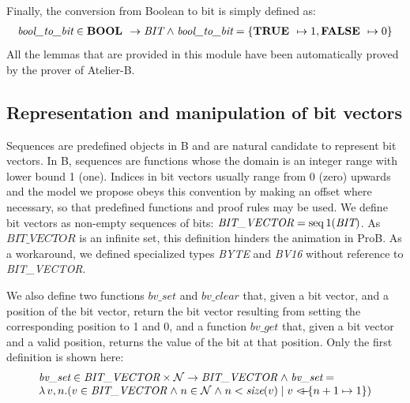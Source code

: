 \documentclass[a4paper]{llncs}
\begin{document}
Finally, the conversion from Boolean to bit is simply defined as:
$$
\begin{array}{l}
\textit{bool\_to\_bit} \in \textbf{BOOL } \rightarrow \textit{BIT} \mathrel{\wedge} \textit{bool\_to\_bit} = \{ \textbf{TRUE } \mapsto 1, \textbf{FALSE } \mapsto 0 \} \\
\end{array}
$$
All the lemmas that are provided in this module have been
automatically proved by the prover of Atelier-B.


\subsection{Representation and manipulation of bit vectors}
\label{subsec:HardwareLibrary2}

Sequences are predefined objects in B and are natural candidate to
represent bit vectors. In B, sequences are functions whose the domain
is an integer range with lower bound 1 (one). Indices in bit vectors
usually range from 0 (zero) upwards and the model we propose obeys
this convention by making an offset where necessary, so that
predefined functions and proof rules may be used. We define bit
vectors as non-empty sequences of bits: $\textit{BIT\_VECTOR} =
\mathop{\mathstrut{\rm seq}}\nolimits1(\textit{BIT})$. As $\textit{BIT\_VECTOR}$ is an infinite set,
this definition hinders the animation in ProB.  As a workaround, we
defined specialized types \textit{BYTE} and \textit{BV16} without
reference to \textit{BIT\_VECTOR}.

%

We also define two functions $\textit{bv\_set}$ and
$\textit{bv\_clear}$ that, given a bit vector, and a position of the
bit vector, return the bit vector resulting from setting the
corresponding position to 1 and 0, and a function $\textit{bv\_get}$
that, given a bit vector and a valid position, returns the value of
the bit at that position. Only the first definition is shown here:
$$
\begin{array}{l}
\textit{bv\_set} \in \textit{BIT\_VECTOR} \times \nat \fun \textit{BIT\_VECTOR} \land \textit{bv\_set} =\\
\lambda v, n . (v \in \textit{BIT\_VECTOR} \land n \in \nat \land n <\textit{size}(v)
\mid v \lover \{ n+1 \mapsto 1 \})
\end{array}
$$
\end{document}
